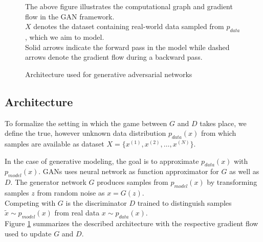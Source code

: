 \begin{figure}[htb]
\centering

  \caption[GAN Architecture]{Architecture used for generative adversarial networks}
  \label{fig:gan_a}
  \medskip
  \small
  The above figure illustrates the computational graph and gradient flow in the GAN framework.\\
  $X$ denotes the dataset containing real-world data sampled from $p_{data}$, which we aim to model.\\
  Solid arrows indicate the forward pass in the model while dashed arrows denote the gradient flow during a backward pass.
\end{figure}


\subsection{Architecture}
\label{sub:gan_arch}
To formalize the setting in which the game between $G$ and $D$ takes place, we define the true, however unknown data distribution $p_{data}(x)$ from which samples are available as dataset $X=\{x^{(1)}, x^{(2)}, \dots, x^{(N)}\}$.

In the case of generative modeling, the goal is to approximate $p_{data}(x)$ with $p_{model}(x)$.
GANs uses neural network as function approximator for $G$ as well as $D$.
The generator network $G$ produces samples from $p_{model}(x)$ by transforming samples $z$ from random noise as $x = G(z)$.\\
Competing with $G$ is the discriminator $D$ trained to distinguish samples $ \tilde{x} \sim p_{model}(x)$ from real data $x \sim p_{data}(x)$.\\
Figure \ref{fig:gan_a} summarizes the described architecture with the respective gradient flow used to update $G$ and $D$.\\




%


